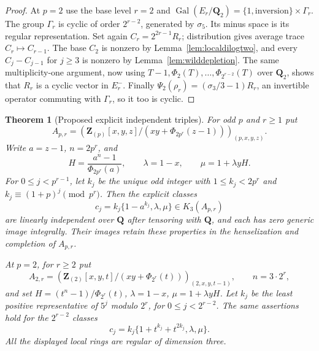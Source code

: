 \documentclass[11pt,a4paper]{article}
\newtheorem{theorem}{Theorem}[section]
\theoremstyle{remark}
\newcommand{\Q}{\mathbf Q}
\newcommand{\Z}{\mathbf Z}
\newcommand{\Gal}{\operatorname{Gal}}
\begin{document}
\begin{proof}
At $p=2$ use the base level $r=2$ and
$\Gal(E_r/\Q_2)=\{1,\text{inversion}\}\times\Gamma_r$.
The group $\Gamma_r$ is cyclic of order $2^{r-2}$, generated by
$\sigma_5$. Its minus space is its regular representation.
Set again $C_r=2^{2r-1}R_r$; distribution gives average trace
$C_r\mapsto C_{r-1}$. The base $C_2$ is nonzero by
Lemma~\ref{lem:localdilogtwo}, and every
$C_j-C_{j-1}$ for $j\geq3$ is nonzero by
Lemma~\ref{lem:wilddepletion}.
The same multiplicity-one argument, now using
$T-1,\Phi_2(T),\ldots,\Phi_{2^{r-2}}(T)$ over $\Q_2$,
shows that $R_r$ is a cyclic vector in $E_r^-$.
Finally $\Psi_2(\rho_r)=(\sigma_3/3-1)R_r$, an invertible
operator commuting with $\Gamma_r$, so it too is cyclic.
\end{proof}

\begin{theorem}[Proposed explicit independent triples]
\label{thm:explicitwildtriples}
For odd $p$ and $r\geq1$ put
\[
 A_{p,r}=\left(\Z_{(p)}[x,y,z]/
       (xy+\Phi_{2p^r}(z-1))\right)_{(p,x,y,z)}.
\]
Write $a=z-1$, $n=2p^r$, and
\[
 H=\frac{a^n-1}{\Phi_{2p^r}(a)},\qquad
 \lambda=1-x,\qquad \mu=1+\lambda yH.
\]
For $0\leq j<p^{r-1}$, let $k_j$ be the unique odd integer with $1\leq k_j<2p^r$ and
$k_j\equiv(1+p)^j\pmod{p^r}$.
Then the explicit classes
\[
 c_j=k_j\{1-a^{k_j},\lambda,\mu\}\in K_3(A_{p,r})
\]
are linearly independent over $\Q$ after tensoring with $\Q$,
and each has zero generic image integrally.
Their images retain these properties in the henselization and
completion of $A_{p,r}$.

At $p=2$, for $r\geq2$ put
\[
 A_{2,r}=\left(\Z_{(2)}[x,y,t]/
                 (xy+\Phi_{2^r}(t))\right)_{(2,x,y,t-1)},
 \qquad n=3\cdot2^r,
\]
and set $H=(t^n-1)/\Phi_{2^r}(t)$,
$\lambda=1-x$, $\mu=1+\lambda yH$.
Let $k_j$ be the least positive representative of $5^j$ modulo
$2^r$, for $0\leq j<2^{r-2}$.
The same assertions hold for the $2^{r-2}$ classes
\[
 c_j=k_j\{1+t^{k_j}+t^{2k_j},\lambda,\mu\}.
\]
All the displayed local rings are regular of dimension three.
\end{theorem}
\end{document}
